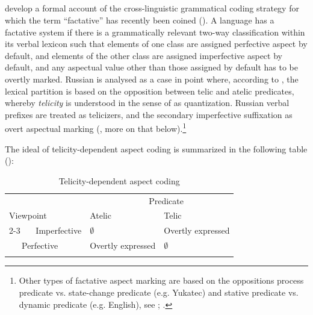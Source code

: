 \documentclass[output=paper,colorlinks,citecolor=brown]{langscibook}
\begin{document}
\subsection{\citet{Bohne2004}}\label{bssection}
\largerpage
\citet{Bohne2004} develop a formal account of the cross-linguistic grammatical coding strategy for which the term ``factative'' has recently been coined (\citealt{Shluinsky2012, ArkadievShluinsky2015}). A language has a factative system if there is a grammatically relevant two-way classification within its verbal lexicon such that elements of one class are assigned perfective aspect by default, and elements of the other class are assigned imperfective aspect by default, and any aspectual value other than those assigned by default has to be overtly marked. Russian is analysed as a case in point where, according to \citet{Bohne2004}, the lexical partition is based on the opposition between telic and atelic predicates, whereby \textit{telicity} is understood in the sense of \citet{Krifka1998} as quantization.
Russian verbal prefixes are treated as telicizers, and the secondary imperfective suffixation as overt aspectual marking (\citealt[274]{Bohne2004}, more on that below).\footnote{Other types of factative aspect marking are based on the oppositions process predicate vs. state-change predicate (e.g. Yukatec) and stative predicate vs. dynamic predicate (e.g. English), see \citet{Bohne2004}; \citet{Shluinsky2012}.}     

The ideal of telicity-dependent aspect coding is summarized in the following table (\citealt[266]{Bohne2004}): 


\begin{table}[h!]
\centering
\begin{tabularx}{.75\textwidth}{lXX}
\lsptoprule
&\multicolumn{2}{l}{~~~~~~~~~~~~~~Predicate}\\
Viewpoint& Atelic & Telic \\\cline{2-3}
~~~Imperfective & $\emptyset$ & Overtly expressed \\
~~~Perfective & Overtly expressed & $\emptyset$\\\lspbottomrule
\end{tabularx}
\caption{Telicity-dependent aspect coding}
\label{diffasptel}
\end{table}

\end{document}
